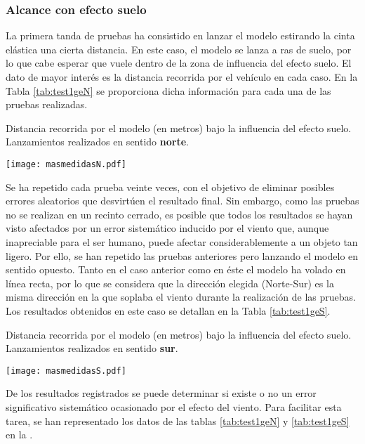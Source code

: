 \FloatBarrier

\subsubsection{Alcance con efecto suelo}
\label{sec:tests:results:ge}

La primera tanda de pruebas ha consistido en lanzar el modelo estirando la cinta elástica una cierta distancia. En este caso, el modelo se lanza a ras de suelo, por lo que cabe esperar que vuele dentro de la zona de influencia del efecto suelo. El dato de mayor interés es la distancia recorrida por el vehículo en cada caso. En la Tabla \ref{tab:test1geN} se proporciona dicha información para cada una de las pruebas realizadas.

\begin{table}[ht]
  \centering
  \caption{Distancia recorrida por el modelo (en metros) bajo la influencia del efecto suelo. Lanzamientos realizados en sentido \textbf{norte}.}
  \label{tab:test1geN}
  \texttt{[image: masmedidasN.pdf]}
\end{table}

Se ha repetido cada prueba veinte veces, con el objetivo de eliminar posibles errores aleatorios que desvirtúen el resultado final. Sin embargo, como las pruebas no se realizan en un recinto cerrado, es posible que todos los resultados se hayan visto afectados por un error sistemático inducido por el viento que, aunque inapreciable para el ser humano, puede afectar considerablemente a un objeto tan ligero. Por ello, se han repetido las pruebas anteriores pero lanzando el modelo en sentido opuesto. Tanto en el caso anterior como en éste el modelo ha volado en línea recta, por lo que se considera que la dirección elegida (Norte-Sur) es la misma dirección en la que soplaba el viento durante la realización de las pruebas. Los resultados obtenidos en este caso se detallan en la Tabla \ref{tab:test1geS}.

\begin{table}[ht]
  \centering
  \caption{Distancia recorrida por el modelo (en metros) bajo la influencia del efecto suelo. Lanzamientos realizados en sentido \textbf{sur}.}
  \label{tab:test1geS}
  \texttt{[image: masmedidasS.pdf]}
\end{table}

De los resultados registrados se puede determinar si existe o no un error significativo sistemático ocasionado por el efecto del viento. Para facilitar esta tarea, se han representado los datos de las tablas \ref{tab:test1geN} y \ref{tab:test1geS} en la .

